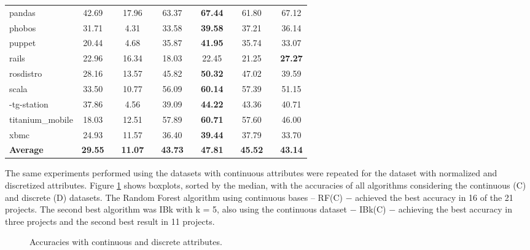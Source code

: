 \documentclass{sig-alternate}
\begin{document}
\begin{table}[t]
\begin{tabular}{@{}lc@{} p{0.12cm} @{}c@{} p{0.12cm} @{}c@{} p{0.12cm} @{}c@{} p{0.12cm} @{}c@{} p{0.12cm} @{}c@{}}
pandas & 42.69 &  & 17.96 &  & 63.37 &  & \textbf{67.44} &  & 61.80 &  & 67.12 \\
phobos & 31.71 &  & 4.31 &  & 33.58 &  & \textbf{39.58} &  & 37.21 &  & 36.14 \\
puppet & 20.44 &  & 4.68 &  & 35.87 &  & \textbf{41.95} &  & 35.74 &  & 33.07 \\
rails & 22.96 &  & 16.34 &  & 18.03 &  & 22.45 &  & 21.25 &  & \textbf{27.27} \\
rosdistro & 28.16 &  & 13.57 &  & 45.82 &  & \textbf{50.32} &  & 47.02 &  & 39.59 \\ 
scala & 33.50 &  & 10.77 &  & 56.09 &  & \textbf{60.14} &  & 57.39 &  & 51.15 \\
-tg-station & 37.86 &  & 4.56 &  & 39.09 &  & \textbf{44.22} &  & 43.36 &  & 40.71 \\
titanium\_mobile & 18.03 &  & 12.51 &  & 57.89 &  & \textbf{60.71} &  & 57.60 &  & 46.00 \\
xbmc & 24.93 &  & 11.57 &  & 36.40 &  & \textbf{39.44} &  & 37.79 &  & 33.70 \\ \midrule
\textbf{Average} & \textbf{29.55} & \textbf{} & \textbf{11.07} & \textbf{} & \textbf{43.73} & \textbf{} & \textbf{47.81} & \textbf{} & \textbf{45.52} & \textbf{} & \textbf{43.14} \\ \bottomrule
\end{tabular}
\end{table}
\vspace{-0.315cm}

The same experiments performed using the datasets with continuous attributes were repeated for the dataset with normalized and discretized attributes. Figure \ref{fig:dc} shows boxplots, sorted by the median, with the accuracies of all algorithms considering the continuous (C) and discrete (D) datasets. 
The Random Forest algorithm using continuous bases $ – $ RF(C) $ - $ achieved the best accuracy in 16 of the 21 projects. The second best algorithm was IBk with k = 5, also using the continuous dataset $ - $ IBk(C) $ - $ achieving the best accuracy in three projects and the second best result in 11 projects. 
\begin{figure}[h]
\centering
{}\label{fig:dc}
\vspace{-0.8cm}
\caption{Accuracies with continuous and discrete attributes.}
\end{figure}
\end{document}
